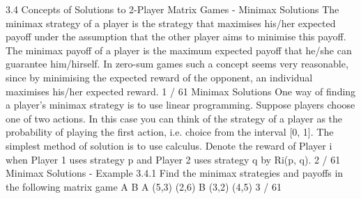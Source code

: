 3.4 Concepts of Solutions to 2-Player Matrix Games -
Minimax Solutions
The minimax strategy of a player is the strategy that maximises
his/her expected payoff under the assumption that the other player
aims to minimise this payoff.
The minimax payoff of a player is the maximum expected payoff
that he/she can guarantee him/hirself.
In zero-sum games such a concept seems very reasonable, since by
minimising the expected reward of the opponent, an individual
maximises his/her expected reward.
1 / 61
Minimax Solutions
One way of finding a player’s minimax strategy is to use linear
programming.
Suppose players choose one of two actions. In this case you can
think of the strategy of a player as the probability of playing the
first action, i.e. choice from the interval [0, 1]. The simplest
method of solution is to use calculus.
Denote the reward of Player i when Player 1 uses strategy p and
Player 2 uses strategy q by Ri(p, q).
2 / 61
Minimax Solutions - Example 3.4.1
Find the minimax strategies and payoffs in the following matrix
game
A B
A (5,3) (2,6)
B (3,2) (4,5)
3 / 61

